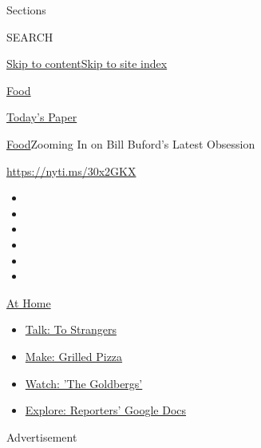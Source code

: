 Sections

SEARCH

\protect\hyperlink{site-content}{Skip to
content}\protect\hyperlink{site-index}{Skip to site index}

\href{https://www.nytimes.com/section/food}{Food}

\href{https://myaccount.nytimes.com/auth/login?response_type=cookie\&client_id=vi}{}

\href{https://www.nytimes.com/section/todayspaper}{Today's Paper}

\href{/section/food}{Food}\textbar{}Zooming In on Bill Buford's Latest
Obsession

\url{https://nyti.ms/30x2GKX}

\begin{itemize}
\item
\item
\item
\item
\item
\item
\end{itemize}

\href{https://www.nytimes.com/spotlight/at-home?action=click\&pgtype=Article\&state=default\&region=TOP_BANNER\&context=at_home_menu}{At
Home}

\begin{itemize}
\tightlist
\item
  \href{https://www.nytimes.com/2020/08/03/well/family/the-benefits-of-talking-to-strangers.html?action=click\&pgtype=Article\&state=default\&region=TOP_BANNER\&context=at_home_menu}{Talk:
  To Strangers}
\item
  \href{https://www.nytimes.com/2020/08/01/at-home/coronavirus-make-pizza-on-a-grill.html?action=click\&pgtype=Article\&state=default\&region=TOP_BANNER\&context=at_home_menu}{Make:
  Grilled Pizza}
\item
  \href{https://www.nytimes.com/2020/07/31/arts/television/goldbergs-abc-stream.html?action=click\&pgtype=Article\&state=default\&region=TOP_BANNER\&context=at_home_menu}{Watch:
  'The Goldbergs'}
\item
  \href{https://www.nytimes.com/interactive/2020/at-home/even-more-reporters-editors-diaries-lists-recommendations.html?action=click\&pgtype=Article\&state=default\&region=TOP_BANNER\&context=at_home_menu}{Explore:
  Reporters' Google Docs}
\end{itemize}

Advertisement

